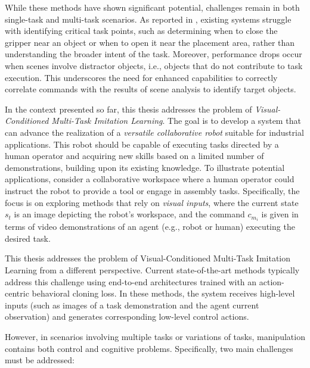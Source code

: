 While these methods have shown significant potential, challenges remain in both single-task and multi-task scenarios. As reported in \cite{jang2022bc_z, yu2018daml}, existing systems struggle with identifying critical task points, such as determining when to close the gripper near an object or when to open it near the placement area, rather than understanding the broader intent of the task. Moreover, performance drops occur when scenes involve distractor objects, i.e., objects that do not contribute to task execution. This underscores the need for enhanced capabilities to correctly correlate commands with the results of scene analysis to identify target objects.

In the context presented so far, this thesis addresses the problem of \textit{Visual-Conditioned Multi-Task Imitation Learning}. The goal is to develop a system that can advance the realization of a \textit{versatile collaborative robot} suitable for industrial applications. This robot should be capable of executing tasks directed by a human operator and acquiring new skills based on a limited number of demonstrations, building upon its existing knowledge. To illustrate potential applications, consider a collaborative workspace where a human operator could instruct the robot to provide a tool or engage in assembly tasks. Specifically, the focus is on exploring methods that rely on \textit{visual inputs}, where the current state $s_{t}$ is an image depicting the robot's workspace, and the command $c_{m_{i}}$ is given in terms of video demonstrations of an agent (e.g., robot or human) executing the desired task.

This thesis addresses the problem of Visual-Conditioned Multi-Task Imitation Learning from a different perspective. Current state-of-the-art methods typically address this challenge using end-to-end architectures trained with an action-centric behavioral cloning loss. In these methods, the system receives high-level inputs (such as images of a task demonstration and the agent current observation) and generates corresponding low-level control actions.

However, in scenarios involving multiple tasks or variations of tasks, manipulation contains both control and cognitive problems. Specifically, two main challenges must be addressed:

